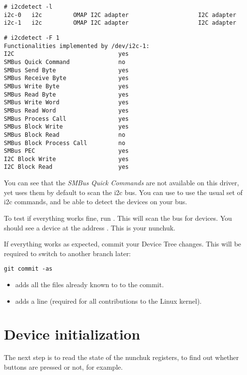 \begin{verbatim}
# i2cdetect -l
i2c-0	i2c       	OMAP I2C adapter                	I2C adapter
i2c-1	i2c       	OMAP I2C adapter                	I2C adapter
\end{verbatim}

\begin{verbatim}
# i2cdetect -F 1
Functionalities implemented by /dev/i2c-1:
I2C                              yes
SMBus Quick Command              no
SMBus Send Byte                  yes
SMBus Receive Byte               yes
SMBus Write Byte                 yes
SMBus Read Byte                  yes
SMBus Write Word                 yes
SMBus Read Word                  yes
SMBus Process Call               yes
SMBus Block Write                yes
SMBus Block Read                 no
SMBus Block Process Call         no
SMBus PEC                        yes
I2C Block Write                  yes
I2C Block Read                   yes
\end{verbatim}

You can see that the {\em SMBus Quick Commands} are not available on
this driver, yet  uses them by default to scan the i2c
bus. You can use  to use the usual set of i2c
commands, and be able to detect the devices on your bus.

To test if everything works fine, run . This will
scan the  bus for devices. You should see a device at the
address . This is your nunchuk.

If everything works as expected, commit your Device Tree changes. This
will be required to switch to another branch later:

\begin{verbatim}
git commit -as
\end{verbatim}

\begin{itemize}
\item {} adds all the files already known to
       to the commit.
\item {} adds a  line (required
      for all contributions to the Linux kernel).
\end{itemize}

\section{Device initialization}

The next step is to read the state of the nunchuk registers, to find out
whether buttons are pressed or not, for example.

